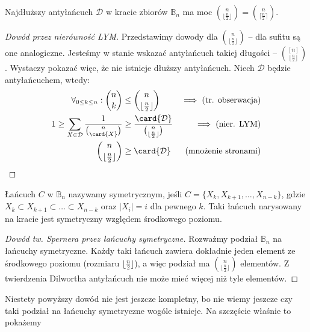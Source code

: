 \begin{theorem}
	Najdłuższy antyłańcuch \(\mathcal D\) w kracie zbiorów $\mathbb B_n$ ma moc $\binom{n}{\lfloor\frac{n}{2}\rfloor} = \binom{n}{\lceil\frac{n}{2}\rceil}$.
\end{theorem}

\begin{proof}[Dowód przez nierówność LYM]
	Przedstawimy dowody dla $\binom{n}{\lfloor\frac n2\rfloor}$ -- dla sufitu są one analogiczne.
	Jesteśmy w stanie wskazać antyłańcuch takiej długości -- $\binom{[n]}{\lfloor\frac{n}{2}\rfloor}$.
	Wystaczy pokazać więc, że nie istnieje dłuższy antyłańcuch.
	Niech $\mathcal{D}$ będzie antyłańcuchem, wtedy:
	\begin{align*}
		\forall_{0 \leq k \leq n}: \binom{n}{k}                       & \leq \binom{n}{\lfloor\frac{n}{2}\rfloor}                            & \implies \text{(tr. obserwacja)} \\
		1 \geq \sum_{X \in \mathcal{D}} \frac{1}{\binom{n}{\card{X}}} & \geq \frac{\card{\mathcal{D}}}{\binom{n}{\lfloor\frac{n}{2}\rfloor}} & \implies \text{(nier. LYM)}      \\
		\binom{n}{\lfloor\frac{n}{2}\rfloor}                          & \geq \card{\mathcal{D}}                                              & \text{(mnożenie stronami)}
	\end{align*}
\end{proof}

\begin{definition}
	Łańcuch $C$ w $\mathbb{B}_n$ nazywamy symetrycznym, jeśli $C=\{X_k, X_{k+1},
		\ldots, X_{n-k}\}$, gdzie $X_k \subset X_{k+1} \subset \ldots \subset
		X_{n-k}$ oraz $|X_i|=i$ dla pewnego $k$. Taki łańcuch narysowany na kracie
	jest symetryczny względem środkowego poziomu.
\end{definition}

\begin{proof}[Dowód tw. Spernera przez łańcuchy symetryczne]
	Rozważmy podział $\mathbb B_n$ na łańcuchy symetryczne. Każdy taki łańcuch
	zawiera dokładnie jeden element ze środkowego poziomu (rozmiaru  $\lfloor \frac
		n2 \rfloor$), a więc podział ma $\binom{n}{\lfloor \frac n2 \rfloor}$
	elementów. Z twierdzenia Dilwortha antyłańcuch nie może mieć więcej niż tyle
	elementów.
\end{proof}
Niestety powyższy dowód nie jest jeszcze kompletny, bo nie wiemy jeszcze czy taki
podział na łańcuchy symetryczne wogóle istnieje. Na szczęście właśnie to pokażemy

